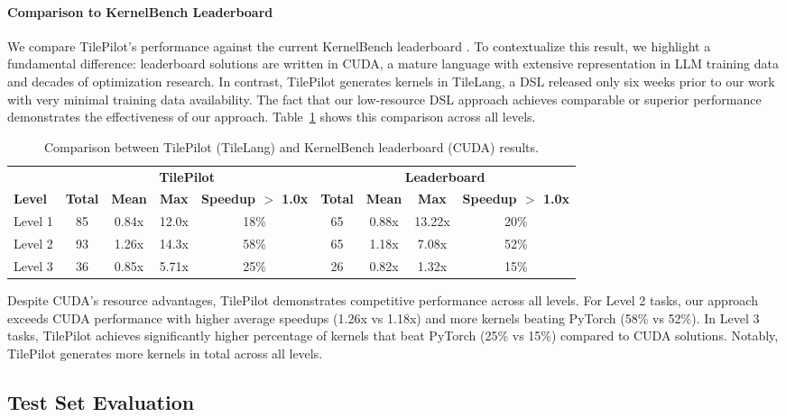 \documentclass{article}
\begin{document}
\paragraph{Comparison to KernelBench Leaderboard}
We compare TilePilot's performance against the current KernelBench leaderboard \cite{kernelsseum2024}. To contextualize this result, we highlight a fundamental difference: leaderboard solutions are written in CUDA, a mature language with extensive representation in LLM training data and decades of optimization research. In contrast, TilePilot generates kernels in TileLang, a DSL released only six weeks prior to our work with very minimal training data availability. The fact that our low-resource DSL approach achieves comparable or superior performance demonstrates the effectiveness of our approach. Table~\ref{tab:leaderboard_comparison} shows this comparison across all levels.
\begin{table}[h]
\centering
\caption{Comparison between TilePilot (TileLang) and KernelBench leaderboard (CUDA) results.}
\label{tab:leaderboard_comparison}
\begin{tabular}{lcccccccc}
\toprule
& \multicolumn{4}{c}{\textbf{TilePilot}} & \multicolumn{4}{c}{\textbf{Leaderboard}} \\
\cmidrule(lr){2-5} \cmidrule(lr){6-9}
\textbf{Level} & \textbf{Total} & \textbf{Mean} & \textbf{Max} & \textbf{Speedup $>$ 1.0x} & \textbf{Total} & \textbf{Mean} & \textbf{Max} & \textbf{Speedup $>$ 1.0x} \\
\midrule
Level 1 & 85 & 0.84x & 12.0x & 18\% & 65 & 0.88x & 13.22x & 20\% \\
Level 2 & 93 & 1.26x & 14.3x & 58\% & 65 & 1.18x & 7.08x & 52\% \\
Level 3 & 36 & 0.85x & 5.71x & 25\% & 26 & 0.82x & 1.32x & 15\% \\
\bottomrule
\end{tabular}
\end{table}


Despite CUDA's resource advantages, TilePilot demonstrates competitive performance across all levels. For Level 2 tasks, our approach exceeds CUDA performance with higher average speedups (1.26x vs 1.18x) and more kernels beating PyTorch (58\% vs 52\%). In Level 3 tasks, TilePilot achieves significantly higher percentage of kernels that beat PyTorch (25\% vs 15\%) compared to CUDA solutions. Notably, TilePilot generates more kernels in total across all levels.

\subsection{Test Set Evaluation}
\end{document}
